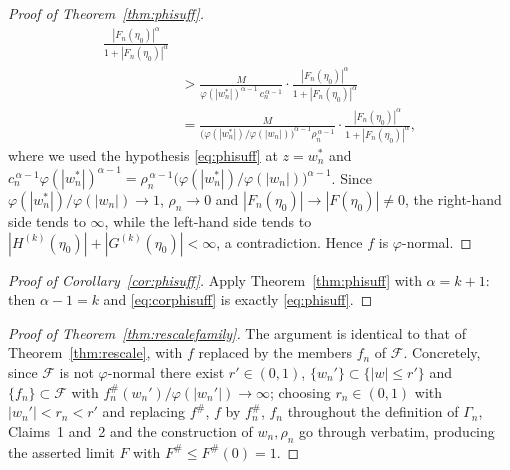 \documentclass[11pt,reqno]{amsart}
\theoremstyle{definition}
\begin{document}
\begin{proof}[Proof of Theorem~\textup{\ref{thm:phisuff}}]
\begin{align*}
\frac{|F_{n}(\eta_{0})|^{\alpha}}{1+|F_{n}(\eta_{0})|^{\alpha}}\\[0.4ex]
&>\frac{M}{\varphi(|w_{n}^{*}|)^{\alpha-1}\,c_{n}^{\,\alpha-1}}\cdot
\frac{|F_{n}(\eta_{0})|^{\alpha}}{1+|F_{n}(\eta_{0})|^{\alpha}}\\[0.4ex]
&=\frac{M}{\big(\varphi(|w_{n}^{*}|)/\varphi(|w_{n}|)\big)^{\alpha-1}\rho_{n}^{\,\alpha-1}}\cdot
\frac{|F_{n}(\eta_{0})|^{\alpha}}{1+|F_{n}(\eta_{0})|^{\alpha}},
\end{align*}
where we used the hypothesis \eqref{eq:phisuff} at $z=w_{n}^{*}$ and
$c_{n}^{\,\alpha-1}\varphi(|w_{n}^{*}|)^{\alpha-1}
=\rho_{n}^{\,\alpha-1}\big(\varphi(|w_{n}^{*}|)/\varphi(|w_{n}|)\big)^{\alpha-1}$. Since
$\varphi(|w_{n}^{*}|)/\varphi(|w_{n}|)\to1$, $\rho_{n}\to0$ and
$|F_{n}(\eta_{0})|\to|F(\eta_{0})|\neq0$, the right-hand side tends to $\infty$, while the
left-hand side tends to $|H^{(k)}(\eta_{0})|+|G^{(k)}(\eta_{0})|<\infty$, a contradiction.
Hence $f$ is $\varphi$-normal.
\end{proof}

\begin{proof}[Proof of Corollary~\textup{\ref{cor:phisuff}}]
Apply Theorem~\ref{thm:phisuff} with $\alpha=k+1$: then $\alpha-1=k$ and
\eqref{eq:corphisuff} is exactly \eqref{eq:phisuff}.
\end{proof}

\begin{proof}[Proof of Theorem~\textup{\ref{thm:rescalefamily}}]
The argument is identical to that of Theorem~\ref{thm:rescale}, with $f$ replaced by the
members $f_{n}$ of $\mathcal F$. Concretely, since $\mathcal F$ is not $\varphi$-normal there
exist $r'\in(0,1)$, $\{w_{n}'\}\subset\{|w|\le r'\}$ and $\{f_{n}\}\subset\mathcal F$ with
$f_{n}^{\#}(w_{n}')/\varphi(|w_{n}'|)\to\infty$; choosing $r_{n}\in(0,1)$ with
$|w_{n}'|<r_{n}<r'$ and replacing $f^{\#}$, $f$ by $f_{n}^{\#}$, $f_{n}$ throughout the
definition of $\Gamma_{n}$, Claims~1 and~2 and the construction of $w_{n},\rho_{n}$ go
through verbatim, producing the asserted limit $F$ with $F^{\#}\le F^{\#}(0)=1$.
\end{proof}
\end{document}
